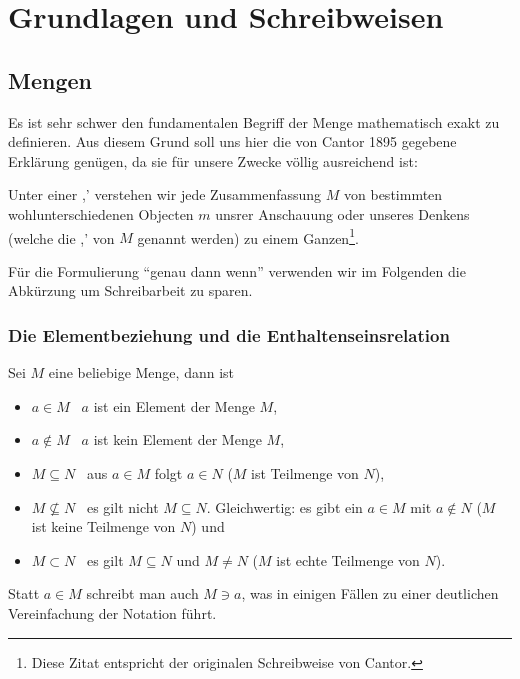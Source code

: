 \section{Grundlagen und Schreibweisen}

\subsection{Mengen}Es ist sehr schwer den fundamentalen Begriff der Menge mathematisch exakt
zu definieren. Aus diesem Grund soll uns hier die von Cantor 1895 gegebene
Erklärung genügen, da sie für unsere Zwecke völlig ausreichend ist:

\begin{definition}
Unter einer ,' verstehen wir jede Zusammenfassung $M$ von 
bestimmten wohlunterschiedenen Objecten $m$ unsrer Anschauung oder 
unseres Denkens (welche die ,' von $M$ genannt werden) zu 
einem Ganzen\footnote{Diese Zitat entspricht der originalen
Schreibweise von Cantor.}. 
\end{definition}

\noindent Für die Formulierung "`genau dann wenn"' verwenden wir im Folgenden
die Abkürzung \gdw{} um Schreibarbeit zu sparen.

\subsubsection{Die Elementbeziehung und die Enthaltenseinsrelation}

\begin{definition}
\label{InclSet}
Sei $M$ eine beliebige Menge, dann ist
\begin{itemize}
%
\item $a \in M$ \gdw\ $a$ ist ein Element der Menge
$M$\index{$\in$},
%
\item $a \not\in M$ \gdw\ $a$ ist kein Element der Menge $M$\index{$\not\in$},
%
\item $M \subseteq N$ \gdw\ aus $a \in M$ folgt $a \in N$ ($M$ ist
Teilmenge von $N$)\index{$\subseteq$},
%
\item $M \not\subseteq N$ \gdw\ es gilt nicht $M \subseteq
N$. Gleichwertig: es gibt ein $a \in M$ mit $a \not\in N$ ($M$ ist
keine Teilmenge von $N$)\index{$\not\subseteq$} und
%
\item $M \subset N$ \gdw\ es gilt $M \subseteq N$ und $M \not= N$ ($M$ ist
echte Teilmenge von $N$)\index{$\subset$}.
%
\end{itemize}
Statt $a \in M$ schreibt man auch $M \ni a$\index{$\ni$}, was in
einigen Fällen zu einer deutlichen Vereinfachung der Notation führt.
\end{definition}

